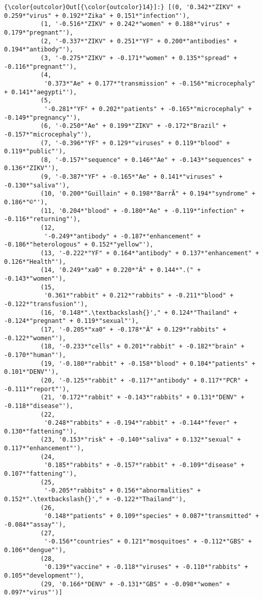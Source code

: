             \begin{Verbatim}[commandchars=\\\{\}]
{\color{outcolor}Out[{\color{outcolor}14}]:} [(0, '0.342*"ZIKV" + 0.259*"virus" + 0.192*"Zika" + 0.151*"infection"'),
          (1, '-0.516*"ZIKV" + 0.242*"women" + 0.188*"virus" + 0.179*"pregnant"'),
          (2, '-0.337*"ZIKV" + 0.251*"YF" + 0.200*"antibodies" + 0.194*"antibody"'),
          (3, '-0.275*"ZIKV" + -0.171*"women" + 0.135*"spread" + -0.116*"pregnant"'),
          (4,
           '0.373*"Ae" + 0.177*"transmission" + -0.156*"microcephaly" + 0.141*"aegypti"'),
          (5,
           '-0.281*"YF" + 0.202*"patients" + -0.165*"microcephaly" + -0.149*"pregnancy"'),
          (6, '-0.250*"Ae" + 0.199*"ZIKV" + -0.172*"Brazil" + -0.157*"microcephaly"'),
          (7, '-0.396*"YF" + 0.129*"viruses" + 0.119*"blood" + 0.119*"public"'),
          (8, '-0.157*"sequence" + 0.146*"Ae" + -0.143*"sequences" + 0.136*"ZIKV"'),
          (9, '-0.387*"YF" + -0.165*"Ae" + 0.141*"viruses" + -0.130*"saliva"'),
          (10, '0.200*"Guillain" + 0.198*"BarrÃ" + 0.194*"syndrome" + 0.186*"©"'),
          (11, '0.204*"blood" + -0.180*"Ae" + -0.119*"infection" + -0.116*"returning"'),
          (12,
           '-0.249*"antibody" + -0.187*"enhancement" + -0.186*"heterologous" + 0.152*"yellow"'),
          (13, '-0.222*"YF" + 0.164*"antibody" + 0.137*"enhancement" + 0.126*"Health"'),
          (14, '0.249*"xa0" + 0.220*"Â" + 0.144*".(" + -0.143*"women"'),
          (15,
           '0.361*"rabbit" + 0.212*"rabbits" + -0.211*"blood" + -0.122*"transfusion"'),
          (16, '0.148*".\textbackslash{}'," + 0.124*"Thailand" + -0.124*"pregnant" + 0.119*"sexual"'),
          (17, '-0.205*"xa0" + -0.178*"Â" + 0.129*"rabbits" + -0.122*"women"'),
          (18, '-0.233*"cells" + 0.201*"rabbit" + -0.182*"brain" + -0.170*"human"'),
          (19, '-0.180*"rabbit" + -0.158*"blood" + 0.104*"patients" + 0.101*"DENV"'),
          (20, '-0.125*"rabbit" + -0.117*"antibody" + 0.117*"PCR" + -0.111*"report"'),
          (21, '0.172*"rabbit" + -0.143*"rabbits" + 0.131*"DENV" + -0.118*"disease"'),
          (22,
           '0.248*"rabbits" + -0.194*"rabbit" + -0.144*"fever" + 0.130*"fattening"'),
          (23, '0.153*"risk" + -0.140*"saliva" + 0.132*"sexual" + 0.117*"enhancement"'),
          (24,
           '0.185*"rabbits" + -0.157*"rabbit" + -0.109*"disease" + 0.107*"fattening"'),
          (25,
           '-0.205*"rabbits" + 0.156*"abnormalities" + 0.152*".\textbackslash{}'," + -0.122*"Thailand"'),
          (26,
           '0.148*"patients" + 0.109*"species" + 0.087*"transmitted" + -0.084*"assay"'),
          (27,
           '-0.156*"countries" + 0.121*"mosquitoes" + -0.112*"GBS" + 0.106*"dengue"'),
          (28,
           '0.139*"vaccine" + -0.118*"viruses" + -0.110*"rabbits" + 0.105*"development"'),
          (29, '0.166*"DENV" + -0.131*"GBS" + -0.098*"women" + 0.097*"virus"')]
\end{Verbatim}
        

